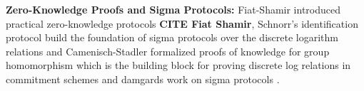 








\item \textbf{Zero-Knowledge Proofs and Sigma Protocols:} Fiat-Shamir introduced practical zero-knowledge protocols \textbf{CITE Fiat Shamir}, Schnorr's identification protocol build the foundation of sigma protocols over the discrete logarithm relations \cite{brands1996privacy, goos_rapid_1997, brands_rethinking_2000} and Camenisch-Stadler formalized proofs of knowledge for group homomorphism which is the building block for proving discrete log relations in commitment schemes \cite{goos_efficient_1997} and damgards work on sigma protocols \cite{damgard_sigma_2010}.

